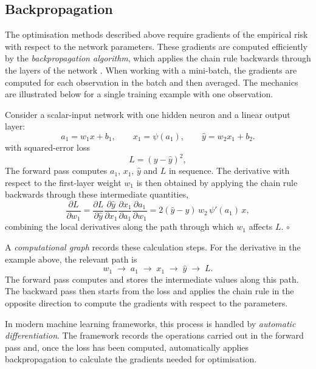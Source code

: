 \subsection{Backpropagation}
\label{subsec:backprop}

The optimisation methods described above require gradients of the empirical risk with respect to the network parameters. These gradients are computed efficiently by the \emph{backpropagation algorithm}, which applies the chain rule backwards through the layers of the network \citep[Ch.~6]{Goodfellow2016}. When working with a mini-batch, the gradients are computed for each observation in the batch and then averaged. The mechanics are illustrated below for a single training example with one observation.


\begin{example}
Consider a scalar-input network with one hidden neuron and a linear output layer:
\[
    a_1 = w_1 x + b_1,
    \qquad
    x_1 = \psi(a_1),
    \qquad
    \hat{y} = w_2 x_1 + b_2.
\]
with squared-error loss
\[
    L = (y-\hat{y})^2,
\]
The forward pass computes $a_1$, $x_1$, $\hat{y}$ and $L$ in sequence. The derivative with respect to the first-layer weight $w_1$ is then obtained by applying the chain rule backwards through these intermediate quantities,
\[
    \frac{\partial L}{\partial w_1}
    =
    \frac{\partial L}{\partial \hat{y}}
    \frac{\partial \hat{y}}{\partial x_1}
    \frac{\partial x_1}{\partial a_1}
    \frac{\partial a_1}{\partial w_1}
    =
    2(\hat{y}-y)\, w_2\, \psi'(a_1)\, x,
\]
combining the local derivatives along the path through which $w_1$ affects $L$. \;\;$\circ$
\end{example}

A \emph{computational graph} records these calculation steps. For the derivative in the example above, the relevant path is
\[
    w_1
    \;\longrightarrow\;
    a_1
    \;\longrightarrow\;
    x_1
    \;\longrightarrow\;
    \hat{y}
    \;\longrightarrow\;
    L.
\]
The forward pass computes and stores the intermediate values along this path. The backward pass then starts from the loss and applies the chain rule in the opposite direction to compute the gradients with respect to the parameters.

In modern machine learning frameworks, this process is handled by
\emph{automatic differentiation}. The framework records the operations carried out in the forward pass and, once the loss has been computed, automatically applies backpropagation to calculate the gradients needed for optimisation.
